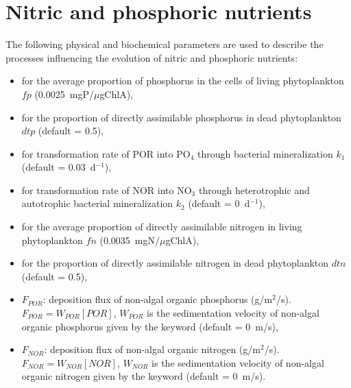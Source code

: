 \section{Nitric and phosphoric nutrients}

The following physical and biochemical parameters are used
to describe the processes influencing the evolution of nitric and phosphoric nutrients:

\begin{itemize}
\item {}
  for the average proportion of phosphorus in the cells of living phytoplankton $fp$ (0.0025~mgP/$\mu$gChlA),
\item {}
  for the proportion of directly assimilable phosphorus in dead phytoplankton $dtp$ (default = 0.5),
\item {}
  for transformation rate of POR into PO$_4$ through bacterial mineralization $k_1$ (default = 0.03~d$^{-1}$),
\item {}
  for transformation rate of NOR into NO$_3$ through heterotrophic
  and autotrophic bacterial mineralization $k_2$ (default = 0~d$^{-1}$),
\item {}
  for the average proportion of directly assimilable nitrogen in living phytoplankton $fn$ (0.0035~mgN/$\mu$gChlA),
\item {}
  for the proportion of directly assimilable nitrogen in dead phytoplankton $dtn$ (default = 0.5),
\item $F_{POR}$: deposition flux of non-algal organic phosphorus (g/m$^2$/s).
  $F_{POR} = W_{POR} [POR]$,
  $W_{POR}$ is the sedimentation velocity of non-algal organic phosphorus
  given by the keyword 
  (default = 0~m/s),
\item $F_{NOR}$: deposition flux of non-algal organic nitrogen (g/m$^2$/s).
  $F_{NOR} = W_{NOR} [NOR]$, $W_{NOR}$ is the sedimentation velocity of non-algal organic nitrogen
  given by the keyword 
  (default = 0~m/s).
\end{itemize}
